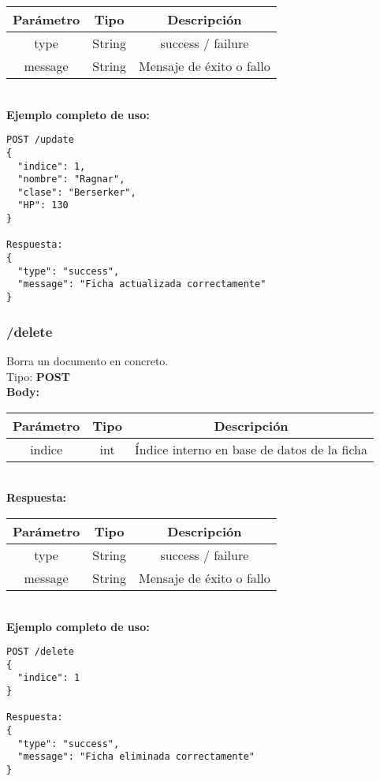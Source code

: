 \documentclass[a4paper,12pt]{article}
\begin{document}
\begin{tabular}{|c|c|c|}
    \hline
    \textbf{Parámetro} & \textbf{Tipo}  & \textbf{Descripción}\\ 
    \hline
    type & String & success / failure\\ 
    \hline
    message & String & Mensaje de éxito o fallo\\ 
    \hline
\end{tabular}\\[1em]

\textbf{Ejemplo completo de uso:}
\begin{verbatim}
POST /update
{
  "indice": 1,
  "nombre": "Ragnar",
  "clase": "Berserker",
  "HP": 130
}

Respuesta:
{
  "type": "success",
  "message": "Ficha actualizada correctamente"
}
\end{verbatim}

\FloatBarrier
\subsubsection{/delete}
Borra un documento en concreto.\\

Tipo: \textbf{POST}\\[0.5em]

\textbf{Body:}\\

\begin{tabular}{|c|c|c|}
    \hline
    \textbf{Parámetro} & \textbf{Tipo}  & \textbf{Descripción}\\ 
    \hline
    indice & int & Índice interno en base de datos de la ficha\\ 
    \hline
\end{tabular}\\[1em]

\textbf{Respuesta:}\\

\begin{tabular}{|c|c|c|}
    \hline
    \textbf{Parámetro} & \textbf{Tipo}  & \textbf{Descripción}\\ 
    \hline
    type & String & success / failure\\ 
    \hline
    message & String & Mensaje de éxito o fallo\\ 
    \hline
\end{tabular}\\[1em]

\textbf{Ejemplo completo de uso:}
\begin{verbatim}
POST /delete
{
  "indice": 1
}

Respuesta:
{
  "type": "success",
  "message": "Ficha eliminada correctamente"
}
\end{verbatim}
\end{document}
